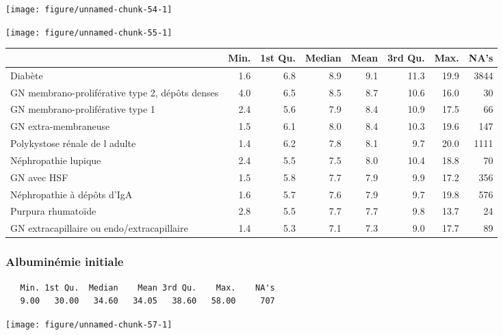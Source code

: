 \documentclass[11pt,a4paper]{article}\usepackage[]{graphicx}\usepackage[]{color}
\makeatletter
\def\maxwidth{ %
  \ifdim\Gin@nat@width>\linewidth
    \linewidth
  \else
    \Gin@nat@width
  \fi
}
\newenvironment{kframe}{%
 \def\at@end@of@kframe{}%
 \ifinner\ifhmode%
  \def\at@end@of@kframe{\end{minipage}}%
  \begin{minipage}{\columnwidth}%
 \fi\fi%
 \def\FrameCommand##1{\hskip\@totalleftmargin \hskip-\fboxsep
 \colorbox{shadecolor}{##1}\hskip-\fboxsep
     \hskip-\linewidth \hskip-\@totalleftmargin \hskip\columnwidth}%
 \MakeFramed {\advance\hsize-\width
   \@totalleftmargin\z@ \linewidth\hsize
   \@setminipage}}%
 {\par\unskip\endMakeFramed%
 \at@end@of@kframe}
\newenvironment{knitrout}{}{} %
\makeatother
\begin{document}
\begin{knitrout}
\color{fgcolor}
\texttt{[image: figure/unnamed-chunk-54-1]} 

\end{knitrout}

\begin{knitrout}
\color{fgcolor}
\texttt{[image: figure/unnamed-chunk-55-1]} 

\end{knitrout}


\begin{table}[H]
\centering
\begingroup\small
\begin{tabular}{lrrrrrrr}
  \hline
 & Min. & 1st Qu. & Median & Mean & 3rd Qu. & Max. & NA's \\ 
  \hline
Diabète & 1.6 & 6.8 & 8.9 & 9.1 & 11.3 & 19.9 & 3844 \\ 
  GN membrano-proliférative type 2, dépôts denses & 4.0 & 6.5 & 8.5 & 8.7 & 10.6 & 16.0 & 30 \\ 
  GN membrano-proliférative type 1 & 2.4 & 5.6 & 7.9 & 8.4 & 10.9 & 17.5 & 66 \\ 
  GN extra-membraneuse & 1.5 & 6.1 & 8.0 & 8.4 & 10.3 & 19.6 & 147 \\ 
  Polykystose rénale de l adulte & 1.4 & 6.2 & 7.8 & 8.1 & 9.7 & 20.0 & 1111 \\ 
  Néphropathie lupique & 2.4 & 5.5 & 7.5 & 8.0 & 10.4 & 18.8 & 70 \\ 
  GN avec HSF & 1.5 & 5.8 & 7.7 & 7.9 & 9.9 & 17.2 & 356 \\ 
  Néphropathie à dépôts d'IgA & 1.6 & 5.7 & 7.6 & 7.9 & 9.7 & 19.8 & 576 \\ 
  Purpura rhumatoïde & 2.8 & 5.5 & 7.7 & 7.7 & 9.8 & 13.7 & 24 \\ 
  GN extracapillaire ou endo/extracapillaire & 1.4 & 5.3 & 7.1 & 7.3 & 9.0 & 17.7 & 89 \\ 
   \hline
\end{tabular}
\endgroup
\end{table}


\subsubsection*{Albuminémie initiale}

\begin{knitrout}
\color{fgcolor}\begin{kframe}
\begin{verbatim}
   Min. 1st Qu.  Median    Mean 3rd Qu.    Max.    NA's 
   9.00   30.00   34.60   34.05   38.60   58.00     707 
\end{verbatim}
\end{kframe}
\texttt{[image: figure/unnamed-chunk-57-1]} 

\end{knitrout}
\end{document}
